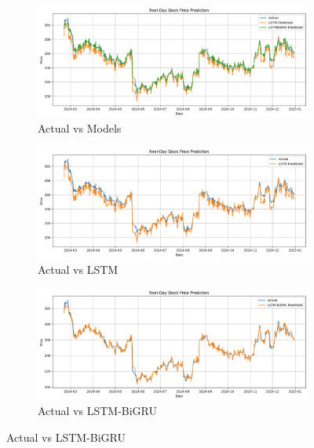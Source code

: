 \begin{figure}[H]
    \centering
    \caption{Actual vs Prediction}
    \label{fig:prediction-combined}
    \begin{subfigure}[b]{\textwidth}
        \centering
        \caption{Actual vs Models}
        \label{fig:pred-full}
        \includegraphics[width=\textwidth]{img/sections/main/pred-full.png}
    \end{subfigure}

    \vspace{0.5em}

    \begin{subfigure}[b]{0.48\textwidth}
        \centering
        \caption{Actual vs LSTM}
        \label{fig:pred-lstm}
        \includegraphics[width=\textwidth]{img/sections/main/pred-lstm.png}
    \end{subfigure}
    \hfill
    \begin{subfigure}[b]{0.48\textwidth}
        \centering
        \caption{Actual vs LSTM-BiGRU}
        \label{fig:pred-bigru}
        \includegraphics[width=\textwidth]{img/sections/main/pred-bigru.png}
    \end{subfigure}
\end{figure}

